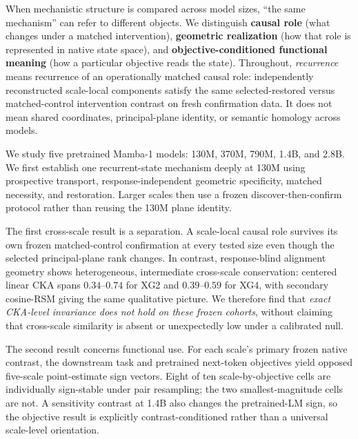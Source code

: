 \documentclass{article}
\begin{document}
When mechanistic structure is compared across model sizes, ``the same mechanism'' can refer to different objects. We distinguish \textbf{causal role} (what changes under a matched intervention), \textbf{geometric realization} (how that role is represented in native state space), and \textbf{objective-conditioned functional meaning} (how a particular objective reads the state). Throughout, \emph{recurrence} means recurrence of an operationally matched causal role: independently reconstructed scale-local components satisfy the same selected-restored versus matched-control intervention contrast on fresh confirmation data. It does not mean shared coordinates, principal-plane identity, or semantic homology across models.

We study five pretrained Mamba-1 models: 130M, 370M, 790M, 1.4B, and 2.8B. We first establish one recurrent-state mechanism deeply at 130M using prospective transport, response-independent geometric specificity, matched necessity, and restoration. Larger scales then use a frozen discover-then-confirm protocol rather than reusing the 130M plane identity.

The first cross-scale result is a separation. A scale-local causal role survives its own frozen matched-control confirmation at every tested size even though the selected principal-plane rank changes. In contrast, response-blind alignment geometry shows heterogeneous, intermediate cross-scale conservation: centered linear CKA spans $0.34$--$0.74$ for XG2 and $0.39$--$0.59$ for XG4, with secondary cosine-RSM giving the same qualitative picture. We therefore find that \emph{exact CKA-level invariance does not hold on these frozen cohorts}, without claiming that cross-scale similarity is absent or unexpectedly low under a calibrated null.

The second result concerns functional use. For each scale's primary frozen native contrast, the downstream task and pretrained next-token objectives yield opposed five-scale point-estimate sign vectors. Eight of ten scale-by-objective cells are individually sign-stable under pair resampling; the two smallest-magnitude cells are not. A sensitivity contrast at 1.4B also changes the pretrained-LM sign, so the objective result is explicitly contrast-conditioned rather than a universal scale-level orientation.
\end{document}
